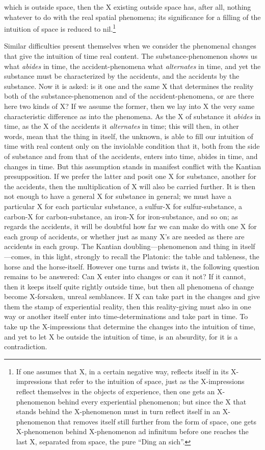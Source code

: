 \documentclass[12pt]{article}
\begin{document}
which is outside space, then the X existing outside space has, after all,
nothing whatever to do with the real spatial phenomena; its significance
for a filling of the intuition of space is reduced to nil.\footnote{If one
assumes that X, in a certain negative way, reflects itself in its
X-impressions that refer to the intuition of space, just as the
X-impressions reflect themselves in the objects of experience, then one
gets an X-phenomenon behind every experiential phenomenon; but since the X
that stands behind the X-phenomenon must in turn reflect itself in an
X-phenomenon that removes itself still further from the form of space, one
gets X-phenomenon behind X-phenomenon ad infinitum before one reaches the
last X, separated from space, the pure ``Ding an sich''.}

Similar difficulties present themselves when we consider the phenomenal
changes that give the intuition of time real content. The
substance-phenomenon shows us what \emph{abides} in time, the
accident-phenomena what \emph{alternates} in time, and yet the substance
must be characterized by the accidents, and the accidents by the substance.
Now it is asked: is it one and the same X that determines the reality both
of the substance-phenomenon and of the accident-phenomena, or are there
here two kinds of X? If we assume the former, then we lay into X the very
same characteristic difference as into the phenomena. As the X of substance
it \emph{abides} in time, as the X of the accidents it \emph{alternates} in
time; this will then, in other words, mean that the thing in itself, the
unknown, is able to fill our intuition of time with real content only on
the inviolable condition that it, both from the side of substance and from
that of the accidents, enters into time, abides in time, and changes in
time. But this assumption stands in manifest conflict with the Kantian
presupposition. If we prefer the latter and posit one X for substance,
another for the accidents, then the multiplication of X will also be
carried further. It is then not enough to have a general X for substance in
general; we must have a particular X for each particular substance, a
sulfur-X for sulfur-substance, a
carbon-X for carbon-substance, an iron-X for iron-substance, and so on; as
regards the accidents, it will be doubtful how far we can make do with one
X for each group of accidents, or whether just as many X's are needed as
there are accidents in each group. The Kantian doubling—phenomenon and
thing in itself—comes, in this light, strongly to recall the Platonic: the
table and tableness, the horse and the horse-itself. However one turns and
twists it, the following question remains to be answered: Can X enter into
changes or can it not? If it cannot, then it keeps itself quite rightly
outside time, but then all phenomena of change become X-forsaken, unreal
semblances. If X can take part in the changes and give them the stamp of
experiential reality, then this reality-giving must also in one way or
another itself enter into time-determinations and take part in time. To
take up the X-impressions that determine the changes into the intuition of
time, and yet to let X be outside the intuition of time, is an absurdity,
for it is a contradiction.
\end{document}
